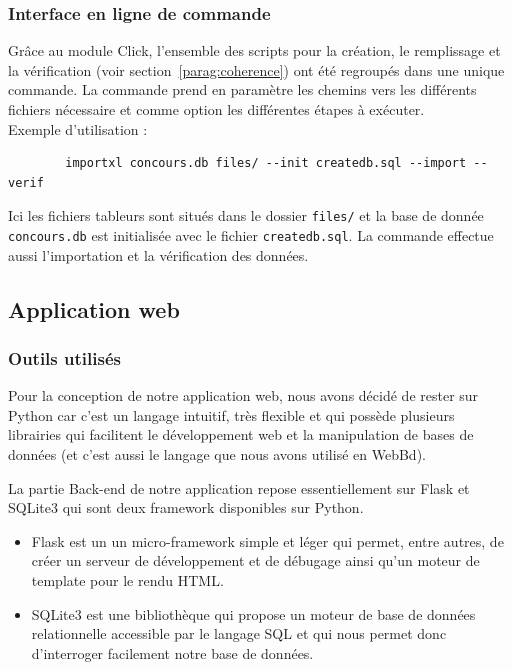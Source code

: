 \documentclass[12pt]{article}
\begin{document}
        \subsubsection{Interface en ligne de commande}
        Grâce au module Click, l'ensemble des scripts pour la création, le remplissage et la vérification (voir section~\ref{parag:coherence}) ont été regroupés dans une unique commande.
        La commande prend en paramètre les chemins vers les différents fichiers nécessaire et comme option les différentes étapes à exécuter.
        \\
        Exemple d'utilisation :
        \begin{verbatim}
        importxl concours.db files/ --init createdb.sql --import --verif
        \end{verbatim}
        Ici les fichiers tableurs sont situés dans le dossier \verb|files/| et la base de donnée \verb|concours.db| est initialisée avec le fichier \verb|createdb.sql|. La commande effectue aussi l'importation et la vérification des données.
        
    
    \newpage
    \subsection{Application web}
        \subsubsection{Outils utilisés}

            Pour la conception de notre application web, nous avons décidé de rester sur Python car c'est un langage intuitif, très flexible et qui possède plusieurs librairies qui facilitent le développement web et la manipulation de bases de données (et c'est aussi le langage que nous avons utilisé en WebBd).
            
            La partie Back-end de notre application repose essentiellement sur \textsf{Flask} et \textsf{SQLite3} qui sont deux framework disponibles sur \textsf{Python}.
            \begin{itemize}

            \item \textsf{Flask} est un un micro-framework simple et léger qui permet, entre autres,  de créer un serveur de développement et de débugage ainsi qu'un moteur de template pour le rendu \textsf{HTML}.
            \item \textsf{SQLite3} est une bibliothèque qui propose un moteur de base de données relationnelle accessible par le langage \textsf{SQL} et qui nous permet donc d'interroger facilement notre base de données.
             \end{itemize}
             
\end{document}
